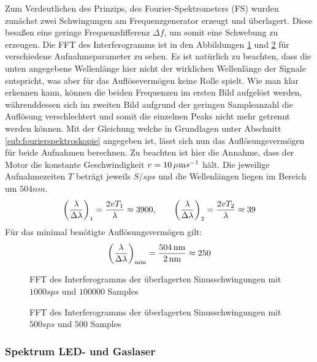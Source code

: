 			Zum Verdeutlichen des Prinzips, des Fourier-Spektrometers (FS) wurden zunächst zwei Schwingungen am Frequenzgenerator erzeugt und überlagert.
			Diese besaßen eine geringe Frequenzdifferenz $\Delta f$, um somit eine Schwebung zu erzeugen.
			Die FFT des Interferogramms ist in den Abbildungen \ref{fig:schwebung-1} und \ref{fig:schwebung-2} für verschiedene Aufnahmeparameter zu sehen.
			Es ist natürlich zu beachten, dass die unten angegebene Wellenlänge hier nicht der wirklichen Wellenlänge der Signale entspricht, was aber für das Auflösevermögen keine Rolle spielt.
			Wie man klar erkennen kann, können die beiden Frequenzen im ersten Bild aufgelöst werden, währenddessen sich im zweiten Bild aufgrund der geringen Sampleanzahl die Auflösung verschlechtert und somit die einzelnen Peaks nicht mehr getrennt werden können.
			Mit der Gleichung welche in Grundlagen unter Abschnitt \ref{sub:fourierspektroskopie} angegeben ist, lässt sich nun das Auflösungsvermögen für beide Aufnahmen berechnen.
			Zu beachten ist hier die Annahme, dass der Motor die konstante Geschwindigkeit $v = 10\,\mu\mathrm{m}s^{-1}$ hält.
			Die jeweilige Aufnahmezeiten $T$ beträgt jeweils $S/sps$ und die Wellenlängen liegen im Bereich um $504 \unit{nm}$.
			\[ \left( \frac{\lambda}{\Delta \lambda} \right)_1 = \frac{2 v T_1}{\lambda} \approx 3900,\qquad \left( \frac{\lambda}{\Delta \lambda} \right)_2 = \frac{2 v T_2}{\lambda} \approx 39 \]
			Für das minimal benötigte Auflösungsvermögen gilt:
			\[ \left( \frac{\lambda}{\Delta \lambda} \right)_{\mathrm{min}} = \frac{504 \, \mathrm{nm}}{2 \, \mathrm{nm}} \approx 250 \]

			\begin{figure}[htb]
				\centering
				
				\caption{FFT des Interferogramms der überlagerten Sinusschwingungen mit $1000\unit{sps}$ und $100000$ Samples}
				\label{fig:schwebung-1}
			\end{figure}

			\begin{figure}[htb]
				\centering
				
				\caption{FFT des Interferogramms der überlagerten Sinusschwingungen mit $500\unit{sps}$ und $500$ Samples}
				\label{fig:schwebung-2}
			\end{figure}
 

		\subsubsection{Spektrum LED- und Gaslaser} %
		\label{ssub:spektrum_led_und_gaslaser}

